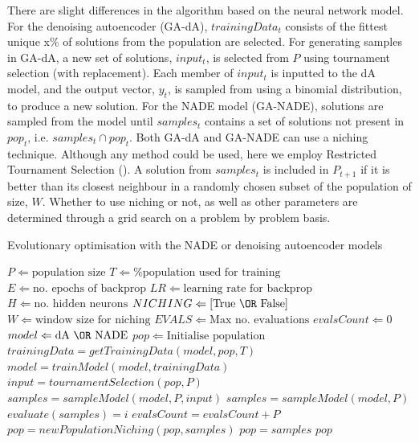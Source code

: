 \documentclass[twoside]{article}
\begin{document}
There are slight differences in the algorithm based on the neural network model. For the denoising autoencoder (GA-dA), \(trainingData_t\) consists of the fittest unique x\% of solutions from the population are selected. For generating samples in GA-dA, a new set of solutions, \(input_t\), is selected from \(P\) using tournament selection (with replacement). Each member of \(input_t\) is inputted to the dA model, and the output vector, \(y_t\), is sampled from using a binomial distribution, to produce a new solution. For the NADE model (GA-NADE), solutions are sampled from the model until \(samples_t\) contains a set of solutions not present in \(pop_t\), i.e. $samples_t \cap pop_t$. Both GA-dA and GA-NADE can use a niching technique. Although any method could be used, here we employ Restricted Tournament Selection (\cite{hboa}). A solution from \(samples_t\) is included in \(P_{t+1}\) if it is better than its closest neighbour in a randomly chosen subset of the population of size, \(W\). Whether to use niching or not, as well as other parameters are determined through a grid search on a problem by problem basis.
 
\begin{algorithm}                      %
\caption{Evolutionary optimisation with the NADE or denoising autoencoder models }          %
\label{alg1}                           %
\begin{algorithmic}                    %
    \STATE $P \Leftarrow \text{population size}$ 
    \STATE $T \Leftarrow \text{\% population used for training}$
    \STATE $E \Leftarrow \text{no. epochs of backprop}$
    \STATE $LR \Leftarrow \text{learning rate for backprop}$
    \STATE $H \Leftarrow \text{no. hidden neurons}$
    \STATE $NICHING \Leftarrow \text{[True \OR False]}$
    \STATE $W \Leftarrow \text{window size for niching}$
    \STATE $EVALS \Leftarrow \text{Max no. evaluations}$
    \STATE $evalsCount \Leftarrow \text{0}$
    \STATE $model \Leftarrow \text{dA \OR NADE}$ 
    \STATE $pop \Leftarrow \text{Initialise population}$
        \STATE $trainingData = getTrainingData(model,pop,T)$
        \STATE $model = trainModel(model,trainingData)$
            \STATE $input = tournamentSelection(pop,P)$
            \STATE $samples = sampleModel(model,P,input)$
        \ELSE
            \STATE $samples = sampleModel(model,P)$
        \ENDIF
        \STATE $evaluate(samples) = i$
        \STATE $evalsCount = evalsCount + P$
            \STATE $pop = newPopulationNiching(pop,samples)$
        \ELSE
            \STATE $pop = samples$
        \ENDIF
    \ENDWHILE
    \RETURN $pop$
\end{algorithmic}
\end{algorithm}
\end{document}
